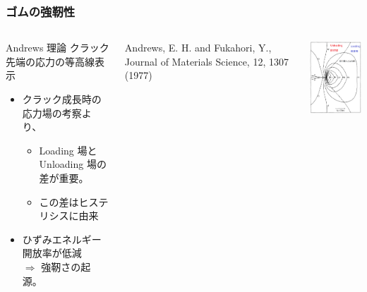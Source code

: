 \documentclass[11pt, dvipdfmx]{beamer}
\begin{document}
\begin{frame}
\frametitle{ゴムの強靭性}


\begin{columns}[totalwidth=1\textwidth]
\begin{exampleblock}{Andrews 理論}
クラック先端の応力の等高線表示
	\begin{itemize}
	\item
	クラック成長時の応力場の考察より、
		\begin{itemize}
		\item
		{\color{red} Loading 場とUnloading 場の差}が重要。
		\item
		この差は\alert{ヒステリシスに由来}
		\end{itemize}	
	\item
	\alert{ひずみエネルギー開放率が低減} \\$\Rightarrow$ 強靭さの起源。
	\end{itemize}
\end{exampleblock}

{Andrews, E. H. and Fukahori, Y., Journal of Materials Science, 12, 1307 (1977)}

\centering
\includegraphics[width=40mm]{./fig/crack.png}
\end{columns}
\end{frame}
\end{document}

